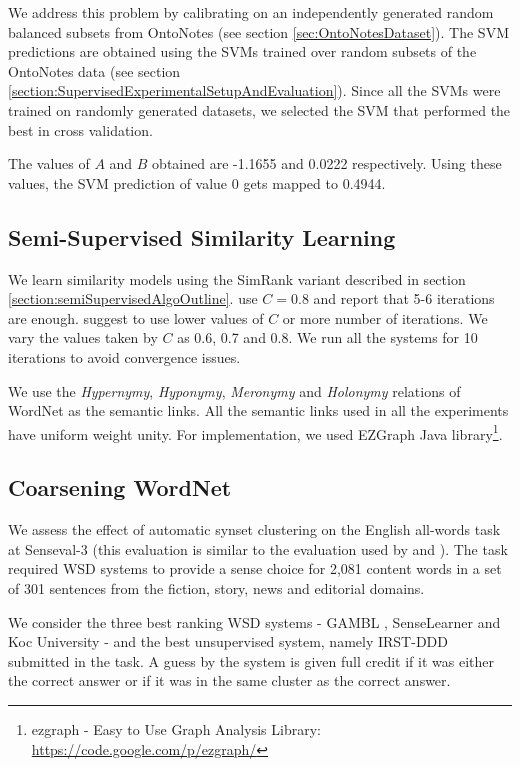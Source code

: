 We address this problem by calibrating on an independently generated random balanced subsets from OntoNotes (see section \ref{sec:OntoNotesDataset}). The SVM predictions are obtained using the SVMs trained over random subsets of the OntoNotes data (see section \ref{section:SupervisedExperimentalSetupAndEvaluation}). Since all the SVMs were trained on randomly generated datasets, we selected the SVM that performed the best in cross validation.

The values of $A$ and $B$ obtained are -1.1655 and 0.0222 respectively. Using these values, the SVM prediction of value 0 gets mapped to 0.4944. 

\subsection{Semi-Supervised Similarity Learning}
We learn similarity models using the SimRank variant described in section \ref{section:semiSupervisedAlgoOutline}. \citep{Jeh02simrank} use $C=0.8$ and report that 5-6 iterations are enough. \citep{LizorkinSimrank} suggest to use lower values of $C$ or more number of iterations. We vary the values taken by $C$ as 0.6, 0.7 and 0.8. We run all the systems for 10 iterations to avoid convergence issues. 

We use the \textit{Hypernymy}, \textit{Hyponymy}, \textit{Meronymy} and \textit{Holonymy} relations of WordNet as the semantic links. All the semantic links used in all the experiments have uniform weight unity. For implementation, we used EZGraph Java library\footnote{ezgraph - Easy to Use Graph Analysis Library:  \url{https://code.google.com/p/ezgraph/}}.

\subsection{Coarsening WordNet}
We assess the effect of automatic synset clustering on the English all-words task at Senseval-3 \citep{Senseval3AllWordsTask} (this evaluation is similar to the evaluation used by \citep{Navigli06meaningfulclustering} and \citep{snow07mergesense}). The task required WSD systems to provide a sense choice for 2,081 content words in a set of 301 sentences from the fiction, story, news and editorial domains.

We consider the three best ranking WSD systems - GAMBL \citep{decadt-EtAl:2004:Senseval-3}, SenseLearner \citep{mihalcea-faruque:2004:Senseval-3} and Koc University \citep{yuret:2004:Senseval-3} - and the best unsupervised system, namely IRST-DDD \citep{strapparava-gliozzo-giuliano:2004:Senseval-3} submitted in the task. A guess by the system is given full credit if it was either the correct answer or if it was in the same cluster as the correct answer.


